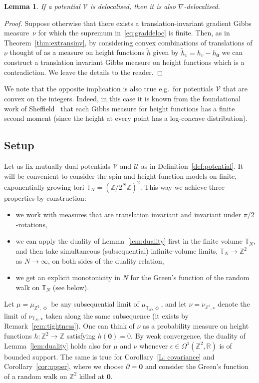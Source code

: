 \documentclass[11pt, reqno]{amsart}
\newtheorem{lemma}[theorem]{Lemma}
\numberwithin{equation}{section}
\theoremstyle{definition}
\theoremstyle{remark}
\newcommand{\RR}{\mathbb{R}}
\newcommand{\exact}{\star}
\newcommand{\coclosed}{\Diamond}
\begin{document}
\begin{lemma} \label{lem:nabla}
If a potential $\mathcal V$ is delocalised, then it is also $\nabla$-delocalised.
\end{lemma}
\begin{proof}
Suppose otherwise that there exists a translation-invariant gradient Gibbs measure~$\nu$ for which the supremum in~\eqref{eq:graddeloc} is finite.
Then, as in Theorem~\ref{thm:extransinv}, by considering convex combinations of translations of $\nu$ thought of as a measure on height functions $\tilde h$ given by $\tilde h_v=h_v-h_{\mathbf 0}$ we can construct a translation invariant Gibbs measure on height functions which is a contradiction. We leave the details to the reader.
\end{proof}

We note that the opposite implication is also true e.g.\ for potentials $\mathcal V$ that are convex on the integers. Indeed, in this case it is known from the foundational work of Sheffield~\cite{sheffield} that each Gibbs measure for height functions has a finite second moment (since the height at every point has a log-concave distribution). 


\subsection{Setup}\label{sec:setup}
Let us fix mutually dual potentials $\mathcal V$ and $\mathcal U$ as in Definition~\ref{def:potential}.
It will be convenient to consider the spin and height function models on finite, exponentially growing tori $\mathbb T_N= (\mathbb Z / 2^N\mathbb Z)^2$. This way we achieve three properties by construction:
\begin{itemize}
\item we work with measures that are translation invariant and invariant under $\pi/2$-rotations,
\item we can apply the duality of Lemma~\ref{lem:duality} first in the finite volume $\mathbb T_N$, and then take simultaneous (subsequential) infinite-volume limits, $\mathbb T_N\to \mathbb Z^2$ as $N\to \infty$, on both sides of the duality relation,
\item we get an explicit monotonicity in $N$ for the Green's function of the random walk on $\mathbb T_N$ (see below).
\end{itemize}

Let $\mu=\mu_{\mathbb Z^2,\coclosed}$ be any subsequential limit of $\mu_{\mathbb T_{N}, \coclosed}$, and let $\nu =\nu_{\mathbb Z^2,\exact}$ denote the limit of $\nu_{\mathbb T_{N}, \exact}$ taken along the same subsequence (it exists by Remark~\ref{rem:tightness}).
One can think of $\nu$ as a probability measure on height functions $h:\mathbb Z^2\to \mathbb Z$ satisfying $h(\mathbf 0)=0$. By weak convergence, the duality of Lemma~\ref{lem:duality} holds also for $\mu$ and $\nu$ whenever $\epsilon \in \Omega^1(\mathbb Z^2,\RR)$ is of bounded support.
The same is true for Corollary~\ref{L: covariance} and Corollary~\ref{cor:upper}, where we choose $\partial = \mathbf 0$ and consider the Green's function of a random walk on $\mathbb Z^2$ killed at $\mathbf 0$.
\end{document}
